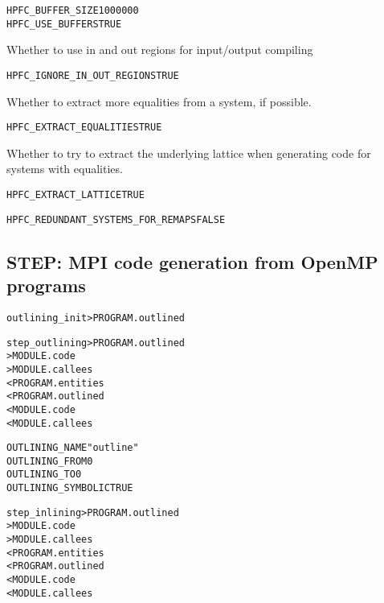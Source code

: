 \documentclass[a4paper]{report}
\newenvironment{PipsProp}{\begin{alltt}}{\end{alltt}}
\newenvironment{PipsMake}{\begin{alltt}}{\end{alltt}}
\begin{document}
\begin{PipsProp}
HPFC_BUFFER_SIZE 1000000
HPFC_USE_BUFFERS TRUE
\end{PipsProp}

Whether to use in and out regions for input/output compiling

\begin{PipsProp}
HPFC_IGNORE_IN_OUT_REGIONS TRUE
\end{PipsProp}

Whether to extract more equalities from a system, if possible.

\begin{PipsProp}
HPFC_EXTRACT_EQUALITIES TRUE
\end{PipsProp}

Whether to try to extract the underlying lattice when generating code for
systems with equalities.

\begin{PipsProp}
HPFC_EXTRACT_LATTICE TRUE
\end{PipsProp}

\begin{PipsProp}
HPFC_REDUNDANT_SYSTEMS_FOR_REMAPS FALSE
\end{PipsProp}


\subsection{STEP: MPI code generation from OpenMP programs}
\label{sec:step:-mpi-code}

\begin{PipsMake}
outlining_init              > PROGRAM.outlined
\end{PipsMake}

\begin{PipsMake}
step_outlining                   > PROGRAM.outlined
                            > MODULE.code
                            > MODULE.callees
   < PROGRAM.entities
   < PROGRAM.outlined
   < MODULE.code
   < MODULE.callees
\end{PipsMake}

\begin{PipsProp}
OUTLINING_NAME "outline"
OUTLINING_FROM 0
OUTLINING_TO 0
OUTLINING_SYMBOLIC TRUE
\end{PipsProp}

\begin{PipsMake}
step_inlining               > PROGRAM.outlined
                            > MODULE.code
                            > MODULE.callees
   < PROGRAM.entities
   < PROGRAM.outlined
   < MODULE.code
   < MODULE.callees
\end{PipsMake}
\end{document}
